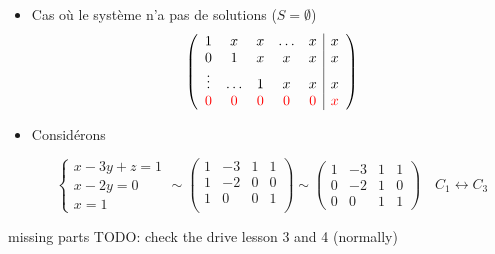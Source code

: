 \documentclass[
    11pt,
    a4paper,
    oneside,
    headinlcude, footinclude,
    twoside,
]{report}
\begin{document}
\begin{itemize}
    \item Cas où le système n'a pas de solutions ($S = \emptyset$)
        $$
            \left(\begin{array}{ccccc|c}
                 1 & x & x & \ldots & x &x\\
                 0 & 1 & x & x & x & x\\
                 \vdots & \ldots & 1 & x & x & x\\
                 {\color{red} 0} & {\color{red} 0} & {\color{red} 0} & {\color{red} 0} &{\color{red}  0} & {\color{red} x} \\
            \end{array}\right) 
        $$

    \item Considérons 

        $$
        \left\{\begin{array}{l}x - 3y + z = 1\\ x - 2y = 0 \\ x =1 \end{array} \right.
        \sim
        \left(\begin{array}{ccc|c}
             1 & -3 & 1 & 1\\
             1 & -2 & 0 & 0 \\
             1 & 0 & 0 & 1 \\
        \end{array}\right) 
        \sim
        \left( \begin{array}{ccc|c}
             1 & -3 & 1 & 1\\
             0 & -2 & 1 & 0 \\
             0 &  0 & 1 & 1 
        \end{array} \right) \quad  C_{1} \leftrightarrow C_{3}
        $$

\end{itemize}


 missing parts TODO: check the drive lesson 3 and 4 (normally)
\end{document}
